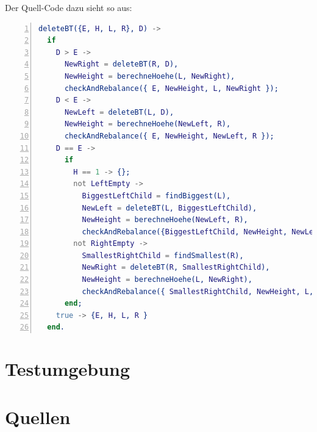 \documentclass{article}
\begin{document}
	Der Quell-Code dazu sieht so aus:\newline
	
\begin{lstlisting}[language=erlang,numbers=left]
deleteBT({E, H, L, R}, D) ->
  if
    D > E -> 
      NewRight = deleteBT(R, D),
      NewHeight = berechneHoehe(L, NewRight),
      checkAndRebalance({ E, NewHeight, L, NewRight });
    D < E ->
      NewLeft = deleteBT(L, D),
      NewHeight = berechneHoehe(NewLeft, R),
      checkAndRebalance({ E, NewHeight, NewLeft, R });
    D == E ->
      if
        H == 1 -> {};
        not LeftEmpty ->
          BiggestLeftChild = findBiggest(L),
          NewLeft = deleteBT(L, BiggestLeftChild),
          NewHeight = berechneHoehe(NewLeft, R),
          checkAndRebalance({BiggestLeftChild, NewHeight, NewLeft, R});
        not RightEmpty ->
          SmallestRightChild = findSmallest(R),
          NewRight = deleteBT(R, SmallestRightChild),
          NewHeight = berechneHoehe(L, NewRight),
          checkAndRebalance({ SmallestRightChild, NewHeight, L, NewRight })
      end;
    true -> {E, H, L, R }
  end.
\end{lstlisting}

  	\newpage
  	\section{Testumgebung}
  
  	\newpage
  	\section{Quellen}
\end{document}
